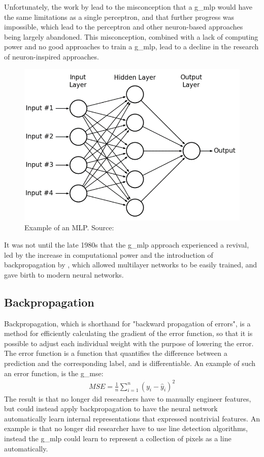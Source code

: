 \par
Unfortunately, the work by \textcite{perceptron3} lead to the misconception that a \gls*{g_mlp} would have the same limitations as a single perceptron, and that further progress was impossible, which lead to the perceptron and other neuron-based approaches being largely abandoned\cite{perceptron_misconceptions}. This misconception, combined with a lack of computing power and no good approaches to train a \gls*{g_mlp}, lead to a decline in the research of neuron-inspired approaches.
\begin{figure}[H]
    \centering
    \includegraphics[width=\linewidth]{resources/related_works/mlp.png}
    \caption{Example of an MLP. Source: \cite{mlp_image}}
    \label{fig:mlp}
\end{figure}
\par
It was not until the late 1980s\cite{perceptron_misconceptions} that the \gls*{g_mlp} approach experienced a revival, led by the increase in computational power and the introduction of backpropagation by \textcite{backprop}, which allowed multilayer networks to be easily trained, and gave birth to modern neural networks.
\subsection{Backpropagation}
Backpropagation\cite{backprop}, which is shorthand for "backward propagation of errors",  is a method for efficiently calculating the gradient of the error function, so that it is possible to adjust each individual weight with the purpose of lowering the error. The error function is a function that quantifies the difference between a prediction and the corresponding label, and is differentiable. An example of such an error function, is the \gls*{g_mse}:
\begin{align*}
    MSE=\frac{1}{n}\sum_{i=1}^n (y_i-\hat{y}_i)^2
\end{align*}
The result is that no longer did researchers have to manually engineer features, but could instead apply backpropagation to have the neural network automatically learn internal representations that expressed nontrivial features. An example is that no longer did researcher have to use line detection algorithms, instead the \gls*{g_mlp} could learn to represent a collection of pixels as a line automatically.
